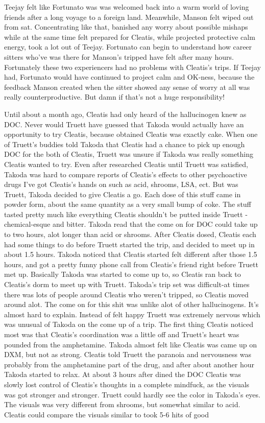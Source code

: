 \documentclass[12pt]{book}
\begin{document}
Teejay felt like Fortunato was was welcomed back into a warm world of loving friends after a long voyage to a foreign land. Meanwhile, Manson felt wiped out from sat. Concentrating like that, banished any worry about possible mishaps while at the same time felt prepared for Cleatis, while projected protective calm energy, took a lot out of Teejay. Fortunato can begin to understand how career sitters who've was there for Manson's tripped have felt after many hours. Fortunately these two experiencers had no problems with Cleatis's trips. If Teejay had, Fortunato would have continued to project calm and OK-ness, because the feedback Manson created when the sitter showed any sense of worry at all was really counterproductive. But damn if that's not a huge responsibility!



Until about a month ago, Cleatis had only heard of the hallucinogen knew as DOC. Never would Truett have guessed that Takoda would actually have an opportunity to try Cleatis, because obtained Cleatis was exactly cake. When one of Truett's buddies told Takoda that Cleatis had a chance to pick up enough DOC for the both of Cleatis, Truett was unsure if Takoda was really something Cleatis wanted to try. Even after researched Cleatis until Truett was satisfied, Takoda was hard to compare reports of Cleatis's effects to other psychoactive drugs I've got Cleatis's hands on such as acid, shrooms, LSA, ect. But was Truett, Takoda decided to give Cleatis a go. Each dose of this stuff came in powder form, about the same quantity as a very small bump of coke. The stuff tasted pretty much like everything Cleatis shouldn't be putted inside Truett - chemical-esque and bitter. Takoda read that the come on for DOC could take up to two hours, alot longer than acid or shrooms. After Cleatis dosed, Cleatis each had some things to do before Truett started the trip, and decided to meet up in about 1.5 hours. Takoda noticed that Cleatis started felt different after those 1.5 hours, and got a pretty funny phone call from Cleatis's friend right before Truett met up. Basically Takoda was started to come up to, so Cleatis ran back to Cleatis's dorm to meet up with Truett. Takoda's trip set was difficult-at times there was lots of people around Cleatis who weren't tripped, so Cleatis moved around alot. The come on for this shit was unlike alot of other hallucinogens. It's almost hard to explain. Instead of felt happy Truett was extremely nervous which was unusual of Takoda on the come up of a trip. The first thing Cleatis noticed most was that Cleatis's coordination was a little off and Truett's heart was pounded from the amphetamine. Takoda almost felt like Cleatis was came up on DXM, but not as strong. Cleatis told Truett the paranoia and nervousness was probably from the amphetamine part of the drug, and after about another hour Takoda started to relax. At about 3 hours after dined the DOC Cleatis was slowly lost control of Cleatis's thoughts in a complete mindfuck, as the visuals was got stronger and stronger. Truett could hardly see the color in Takoda's eyes. The visuals was very different from shrooms, but somewhat similar to acid. Cleatis could compare the visuals similar to took 5-6 hits of good 
\end{document}
